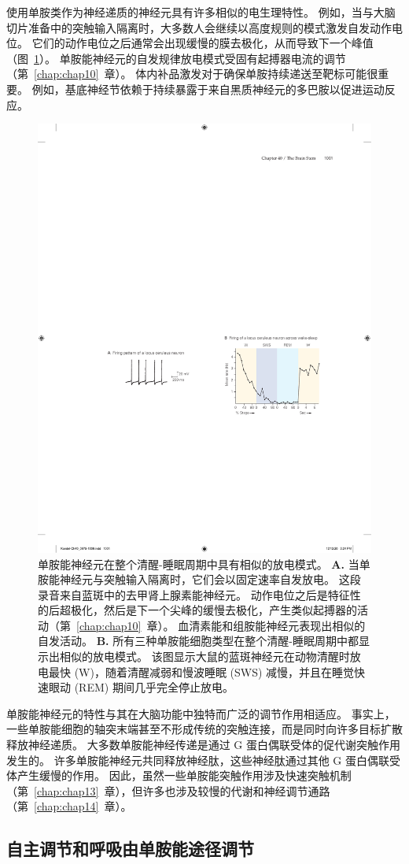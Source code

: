 使用单胺类作为神经递质的神经元具有许多相似的电生理特性。
例如，当与大脑切片准备中的突触输入隔离时，大多数人会继续以高度规则的模式激发自发动作电位。
它们的动作电位之后通常会出现缓慢的膜去极化，从而导致下一个峰值（图~\ref{fig:40_12}）。
单胺能神经元的自发规律放电模式受固有起搏器电流的调节（第~\ref{chap:chap10}~章）。
体内补品激发对于确保单胺持续递送至靶标可能很重要。
例如，基底神经节依赖于持续暴露于来自黑质神经元的多巴胺以促进运动反应。


\begin{figure}[htbp]
	\centering
	\includegraphics[width=0.45\linewidth]{chap40/fig_40_12}
	\caption{单胺能神经元在整个清醒-睡眠周期中具有相似的放电模式。
		\textbf{A.} 当单胺能神经元与突触输入隔离时，它们会以固定速率自发放电。
		这段录音来自蓝斑中的去甲肾上腺素能神经元。
		动作电位之后是特征性的后超极化，然后是下一个尖峰的缓慢去极化，产生类似起搏器的活动（第~\ref{chap:chap10}~章）。
		血清素能和组胺能神经元表现出相似的自发活动。
		\textbf{B.} 所有三种单胺能细胞类型在整个清醒-睡眠周期中都显示出相似的放电模式。
		该图显示大鼠的蓝斑神经元在动物清醒时放电最快 (W)，随着清醒减弱和慢波睡眠 (SWS) 减慢，并且在睡觉快速眼动 (REM) 期间几乎完全停止放电\cite{aston1981activity}。}
	\label{fig:40_12}
\end{figure}


单胺能神经元的特性与其在大脑功能中独特而广泛的调节作用相适应。
事实上，一些单胺能细胞的轴突末端甚至不形成传统的突触连接，而是同时向许多目标扩散释放神经递质。
大多数单胺能神经传递是通过 G 蛋白偶联受体的促代谢突触作用发生的。
许多单胺能神经元共同释放神经肽，这些神经肽通过其他 G 蛋白偶联受体产生缓慢的作用。
因此，虽然一些单胺能突触作用涉及快速突触机制（第~\ref{chap:chap13}~章），但许多也涉及较慢的代谢和神经调节通路（第~\ref{chap:chap14}~章）。



\subsection{自主调节和呼吸由单胺能途径调节}

